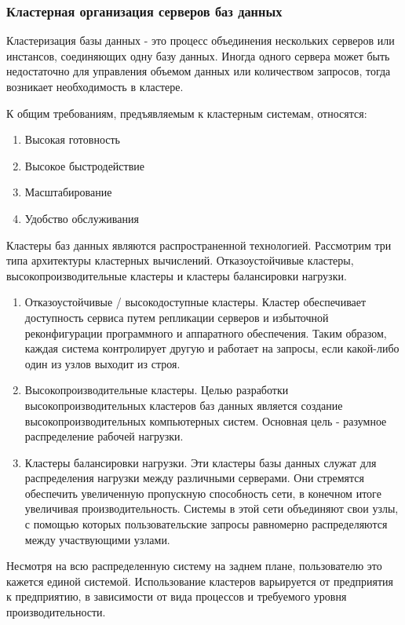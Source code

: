 \subsubsection{Кластерная организация серверов баз данных}

Кластеризация базы данных - это процесс объединения нескольких серверов или инстансов, соединяющих одну базу данных. Иногда одного сервера может быть недостаточно для управления объемом данных или количеством запросов, тогда возникает необходимость в кластере. 
 
К общим требованиям, предъявляемым к кластерным системам, относятся:
\begin{enumerate}
    \item Высокая готовность
    \item Высокое быстродействие
    \item Масштабирование
    \item Удобство обслуживания
\end{enumerate}

Кластеры баз данных являются распространенной технологией.  Рассмотрим три типа архитектуры кластерных вычислений. Отказоустойчивые кластеры, высокопроизводительные кластеры и кластеры балансировки нагрузки.

\begin{enumerate}
\item Отказоустойчивые / высокодоступные кластеры. Кластер обеспечивает доступность сервиса путем репликации серверов и избыточной реконфигурации программного и аппаратного обеспечения. Таким образом, каждая система контролирует другую и работает на запросы, если какой-либо один из узлов выходит из строя.

\item Высокопроизводительные кластеры. Целью разработки высокопроизводительных кластеров баз данных является создание высокопроизводительных компьютерных систем. Основная цель - разумное распределение рабочей нагрузки.

\item Кластеры балансировки нагрузки. Эти кластеры базы данных служат для распределения нагрузки между различными серверами. Они стремятся обеспечить увеличенную пропускную способность сети, в конечном итоге увеличивая производительность. Системы в этой сети объединяют свои узлы, с помощью которых пользовательские запросы равномерно распределяются между участвующими узлами.
\end{enumerate}

Несмотря на всю распределенную систему на заднем плане, пользователю это кажется единой системой. Использование кластеров варьируется от предприятия к предприятию, в зависимости от вида процессов и требуемого уровня производительности.
